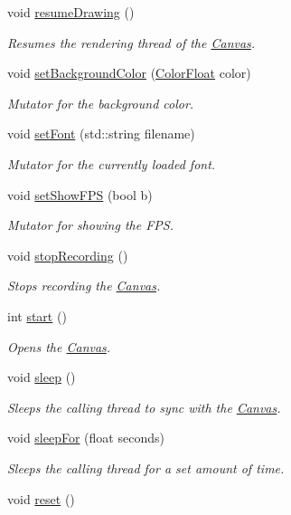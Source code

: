 \begin{DoxyCompactItemize}
void \hyperlink{classtsgl_1_1_canvas_a56bf3c6e4eb7b06015d1c115aaa143f8}{resume\+Drawing} ()
\begin{DoxyCompactList}\small\item\em Resumes the rendering thread of the \hyperlink{classtsgl_1_1_canvas}{Canvas}. \end{DoxyCompactList}\item 
void \hyperlink{classtsgl_1_1_canvas_abb668fe42e2fe7f269b255152df959d8}{set\+Background\+Color} (\hyperlink{structtsgl_1_1_color_float}{Color\+Float} color)
\begin{DoxyCompactList}\small\item\em Mutator for the background color. \end{DoxyCompactList}\item 
void \hyperlink{classtsgl_1_1_canvas_a692edf8e37c7714cdf2a58ea530c63e9}{set\+Font} (std\+::string filename)
\begin{DoxyCompactList}\small\item\em Mutator for the currently loaded font. \end{DoxyCompactList}\item 
void \hyperlink{classtsgl_1_1_canvas_a8722c579dfa55a45e139bfeb269d73ff}{set\+Show\+F\+P\+S} (bool b)
\begin{DoxyCompactList}\small\item\em Mutator for showing the F\+P\+S. \end{DoxyCompactList}\item 
void \hyperlink{classtsgl_1_1_canvas_ac6035d87aa3bf077031bc0bb6f419b17}{stop\+Recording} ()
\begin{DoxyCompactList}\small\item\em Stops recording the \hyperlink{classtsgl_1_1_canvas}{Canvas}. \end{DoxyCompactList}\item 
int \hyperlink{classtsgl_1_1_canvas_a654315f9b08a9b3b072eebf4b4d8ae89}{start} ()
\begin{DoxyCompactList}\small\item\em Opens the \hyperlink{classtsgl_1_1_canvas}{Canvas}. \end{DoxyCompactList}\item 
void \hyperlink{classtsgl_1_1_canvas_a2604fa056d4541f918ccf447eda1f3cf}{sleep} ()
\begin{DoxyCompactList}\small\item\em Sleeps the calling thread to sync with the \hyperlink{classtsgl_1_1_canvas}{Canvas}. \end{DoxyCompactList}\item 
void \hyperlink{classtsgl_1_1_canvas_a6674cc86b9a54b6a564021fddce47e36}{sleep\+For} (float seconds)
\begin{DoxyCompactList}\small\item\em Sleeps the calling thread for a set amount of time. \end{DoxyCompactList}\item 
\hypertarget{classtsgl_1_1_canvas_ada6403439b583910d27e497148da5f2e}{}void \hyperlink{classtsgl_1_1_canvas_ada6403439b583910d27e497148da5f2e}{reset} ()\label{classtsgl_1_1_canvas_ada6403439b583910d27e497148da5f2e}


\end{DoxyCompactItemize}
